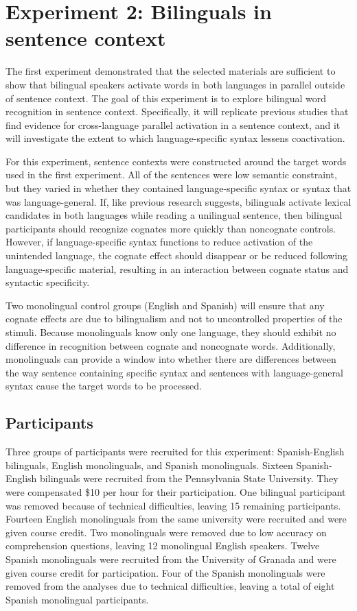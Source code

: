 \chapter{Experiment 2: Bilinguals in sentence context}\label{SEInContext}
The first experiment demonstrated that the selected materials are sufficient to show that bilingual speakers activate words in both languages in parallel outside of sentence context. The goal of this experiment is to explore bilingual word recognition in sentence context. Specifically, it will replicate previous studies that find evidence for cross-language parallel activation in a sentence context, and it will investigate the extent to which language-specific syntax lessens coactivation. 

For this experiment, sentence contexts were constructed around the target words used in the first experiment. All of the sentences were low semantic constraint, but they varied in whether they contained language-specific syntax or syntax that was language-general. If, like previous research suggests, bilinguals activate lexical candidates in both languages while reading a unilingual sentence, then bilingual participants should recognize cognates more quickly than noncognate controls. However, if language-specific syntax functions to reduce activation of the unintended language, the cognate effect should disappear or be reduced following language-specific material, resulting in an interaction between cognate status and syntactic specificity. 

Two monolingual control groups (English and Spanish) will ensure that any cognate effects are due to bilingualism and not to uncontrolled properties of the stimuli. Because monolinguals know only one language, they should exhibit no difference in recognition between cognate and noncognate words. Additionally, monolinguals can provide a window into whether there are differences between the way sentence containing specific syntax and sentences with language-general syntax cause the target words to be processed.   

\section{Participants}
Three groups of participants were recruited for this experiment: Spanish-English bilinguals, English monolinguals, and Spanish monolinguals. Sixteen Spanish-English bilinguals were recruited from the Pennsylvania State University. They were compensated \$10 per hour for their participation. One bilingual participant was removed because of technical difficulties, leaving 15 remaining participants. Fourteen English monolinguals from the same university were recruited and were given course credit. Two monolinguals were removed due to low accuracy on comprehension questions, leaving 12 monolingual English speakers. Twelve Spanish monolinguals were recruited from the University of Granada and were given course credit for participation. Four of the Spanish monolinguals were removed from the analyses due to technical difficulties, leaving a total of eight Spanish monolingual participants.

